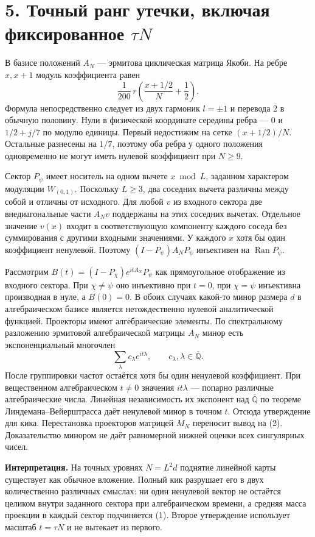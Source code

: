 \documentclass[11pt,a4paper]{article}
\newcommand{\Qbar}{\overline{\mathbb Q}}
\newcommand{\sect}[1]{\section*{\sffamily\color{ink}#1}}
\newcommand{\subt}[1]{\par\medskip\noindent\textbf{#1.}\quad}
\begin{document}
\newpage
\sect{5. Точный ранг утечки, включая фиксированное \(\tau N\)}
В базисе положений \(A_N\) — эрмитова циклическая матрица Якоби. На ребре \(x,x+1\) модуль коэффициента равен
\[
           \frac1{200}\,r\!\left(\frac{x+1/2}{N}+\frac12\right).
\]
Формула непосредственно следует из двух гармоник \(l=\pm1\) и перевода \(\overline2\) в обычную половину. Нули в физической координате середины ребра — \(0\) и \(1/2+j/7\) по модулю единицы. Первый недостижим на сетке \((x+1/2)/N\). Остальные разнесены на \(1/7\), поэтому оба ребра у одного положения одновременно не могут иметь нулевой коэффициент при \(N\ge9\).

Сектор \(P_\psi\) имеет носитель на одном вычете \(x\bmod L\), заданном характером модуляции \(W_{(0,1)}\). Поскольку \(L\ge3\), два соседних вычета различны между собой и отличны от исходного. Для любой \(v\) из входного сектора две внедиагональные части \(A_Nv\) поддержаны на этих соседних вычетах. Отдельное значение \(v(x)\) входит в соответствующую компоненту каждого соседа без суммирования с другими входными значениями. У каждого \(x\) хотя бы один коэффициент ненулевой. Поэтому \((I-P_\psi) A_NP_\psi\) инъективен на \(\operatorname{Ran}P_\psi\).

Рассмотрим \(B(t)=(I-P_\chi)e^{itA_N} P_\psi\) как прямоугольное отображение из входного сектора. При \(\chi\ne\psi\) оно инъективно при \(t=0\), при \(\chi=\psi\) инъективна производная в нуле, а \(B(0)=0\). В обоих случаях какой-то минор размера \(d\) в алгебраическом базисе является нетождественно нулевой аналитической функцией. Проекторы имеют алгебраические элементы. По спектральному разложению эрмитовой алгебраической матрицы \(A_N\) минор есть экспоненциальный многочлен
\[
                         \sum_\lambda c_\lambda e^{it\lambda},
           \qquad c_\lambda,\lambda\in\Qbar .
\]
После группировки частот остаётся хотя бы один ненулевой коэффициент. При вещественном алгебраическом \(t\ne0\) значения \(it\lambda\) — попарно различные алгебраические числа. Линейная независимость их экспонент над \(\Qbar\) по теореме Линдемана--Вейерштрасса даёт ненулевой минор в точном \(t\). Отсюда утверждение для кика. Перестановка проекторов матрицей \(M_N\) переносит вывод на (2). Доказательство минором не даёт равномерной нижней оценки всех сингулярных чисел.

\subt{Интерпретация}
На точных уровнях \(N=L^2d\) поднятие линейной карты существует как обычное вложение. Полный кик разрушает его в двух количественно различных смыслах: ни один ненулевой вектор не остаётся целиком внутри заданного сектора при алгебраическом времени, а средняя масса проекции в каждый сектор подчиняется (1). Второе утверждение использует масштаб \(t=\tau N\) и не вытекает из первого.
\end{document}
